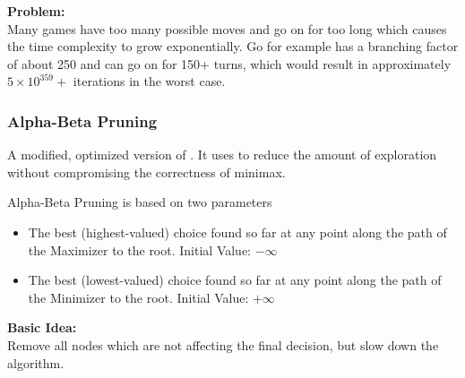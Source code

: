 \documentclass[
../EiKI_Summary.tex,
]
{subfiles}
\begin{document}
\textbf{Problem:}\\
Many games have too many possible moves and go on for too long which causes the time complexity to grow exponentially. Go for example has a branching factor of about 250 and can go on for 150+ turns, which would result in approximately $5\times 10^{359} +$ iterations in the worst case. 

\subsubsection{Alpha-Beta Pruning}
\begin{defbox*}
    A modified, optimized version of . It uses  to reduce the amount of exploration without compromising the correctness of minimax.
\end{defbox*}

Alpha-Beta Pruning is based on two parameters
\begin{itemize}
    \item {} The best (highest-valued) choice found so far at any point along the path of the Maximizer to the root. Initial Value: $-\infty$
    \item {} The best (lowest-valued) choice found so far at any point along the path of the Minimizer to the root. Initial Value: $+\infty$ 
\end{itemize}

\textbf{Basic Idea:}\\
Remove all nodes which are not affecting the final decision, but slow down the algorithm.
\end{document}

